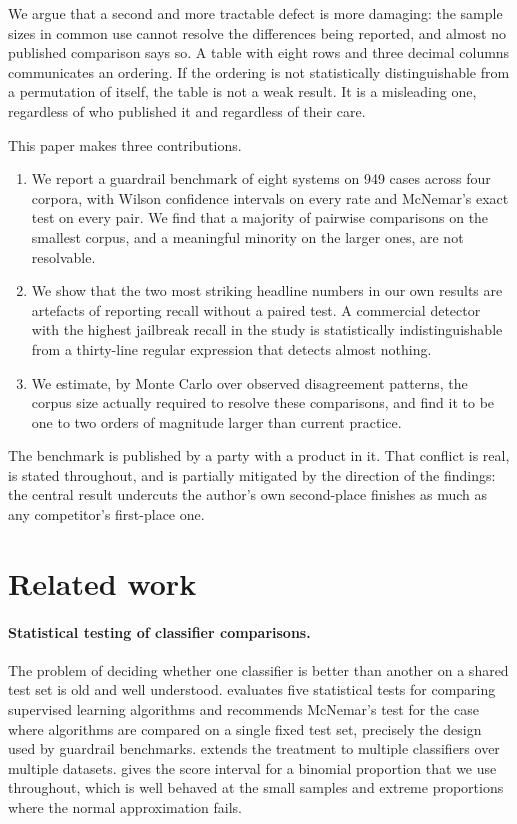 \documentclass[11pt]{article}
\begin{document}
We argue that a second and more tractable defect is more damaging: the sample
sizes in common use cannot resolve the differences being reported, and almost no
published comparison says so. A table with eight rows and three decimal columns
communicates an ordering. If the ordering is not statistically distinguishable
from a permutation of itself, the table is not a weak result. It is a
misleading one, regardless of who published it and regardless of their care.

This paper makes three contributions.

\begin{enumerate}
\item We report a guardrail benchmark of eight systems on 949 cases across four
corpora, with Wilson confidence intervals on every rate and McNemar's exact test
on every pair. We find that a majority of pairwise comparisons on the smallest
corpus, and a meaningful minority on the larger ones, are not resolvable.

\item We show that the two most striking headline numbers in our own results are
artefacts of reporting recall without a paired test. A commercial detector with
the highest jailbreak recall in the study is statistically indistinguishable from
a thirty-line regular expression that detects almost nothing.

\item We estimate, by Monte Carlo over observed disagreement patterns, the corpus
size actually required to resolve these comparisons, and find it to be one to two
orders of magnitude larger than current practice.
\end{enumerate}

The benchmark is published by a party with a product in it. That conflict is
real, is stated throughout, and is partially mitigated by the direction of the
findings: the central result undercuts the author's own second-place finishes as
much as any competitor's first-place one.

\section{Related work}

\paragraph{Statistical testing of classifier comparisons.}
The problem of deciding whether one classifier is better than another on a shared
test set is old and well understood. \citet{dietterich1998} evaluates five
statistical tests for comparing supervised learning algorithms and recommends
McNemar's test \citep{mcnemar1947} for the case where algorithms are compared on
a single fixed test set, precisely the design used by guardrail benchmarks.
\citet{demsar2006} extends the treatment to multiple classifiers over multiple
datasets. \citet{wilson1927} gives the score interval for a binomial proportion
that we use throughout, which is well behaved at the small samples and extreme
proportions where the normal approximation fails.
\end{document}

